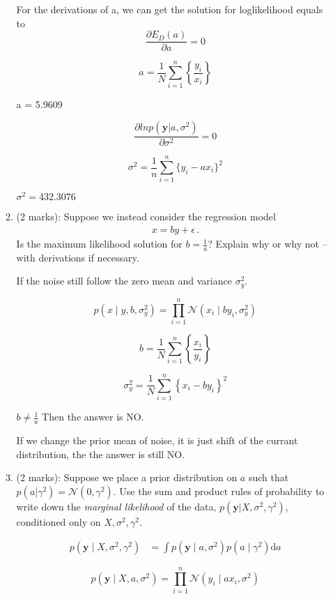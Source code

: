 \documentclass[11pt]{article}
\newcommand{\mbf}[1]{{\boldsymbol{\mathbf{#1}}}}
\renewcommand{\bm}{\mbf}
\begin{document}
\begin{enumerate}
\begin{enumerate}[label=(\alph*)]
For the derivations of a, we can get the solution for loglikelihood equals to 
$$\frac{\partial{E_D(a)}}{\partial{a}} = 0$$

$$a = \frac{1}{N}\sum_{i=1}^{n}\left\{ \frac{y_i}{x_i} \right\}$$

a = 5.9609


$$\frac{\partial{ln p(\bm{y} | a, \sigma^2)}}{\partial{\sigma^2}} = 0$$

$$
\sigma^2=\frac{1}{n} \sum_{i=1}^{n}\{{y_{i}-ax_i}\}^{2}
$$

$\sigma^2 = 432.3076$

\item (2 marks): Suppose we instead consider the regression model 
\begin{align}
x = b y + \epsilon \,.
\end{align}
Is the maximum likelihood solution for $b = \frac{1}{a}$?  Explain why or why not -- with derivations if necessary.

If the noise still follow the zero mean and variance $\sigma_y^2$.


$$
p\left(x \mid y, b, \sigma_y^{2}\right)=\prod_{i=1}^{n} \mathcal{N}\left(x_{i} \mid b y_{i}, \sigma_y^{2}\right)
$$

$$
b=\frac{1}{N} \sum_{i=1}^{n}\left\{\frac{x_{i}}{y_{i}}\right\}
$$

$$
\sigma_y^{2}=\frac{1}{N} \sum_{i=1}^{n}\left\{x_{i}-b y_{i}\right\}^{2}
$$


$b \neq \frac{1}{a}$
Then the answer is NO.

If we change the prior mean of noise, it is just shift of the currant distribution, the the answer is still NO.


\item (2 marks): Suppose we place a prior distribution on $a$ such that $p(a | \gamma^2) = \mathcal{N}(0,\gamma^2)$.  Use
the sum and product rules of probability to write down the \emph{marginal likelihood} of the data, 
$p(\bm{y} | X, \sigma^2, \gamma^2)$, conditioned only on $X, \sigma^2, \gamma^2$.  


\begin{align}
p(\mathbf{y} \mid X, \sigma^2, \gamma^2)
&=\int p(\mathbf{y} \mid {a}, \sigma^2) p({a} \mid \gamma^2) \mathrm{d} a 
\end{align}

$$
p(\mathbf{y} \mid {X}, {a}, \sigma^2)=\prod_{i=1}^{n} \mathcal{N}\left(y_{i} \mid {a} {x}_{i}, \sigma^2 \right)
$$



\end{enumerate}
\end{enumerate}
\end{document}
